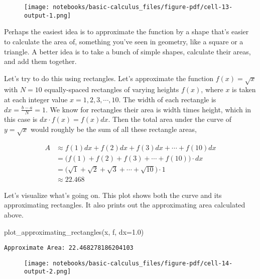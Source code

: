 \documentclass[
  letterpaper,
  DIV=11,
  numbers=noendperiod]{scrreprt}
\newenvironment{Shaded}{\begin{snugshade}}{\end{snugshade}}
\newcommand{\FloatTok}[1]{\textcolor[rgb]{0.68,0.00,0.00}{#1}}
\newcommand{\NormalTok}[1]{\textcolor[rgb]{0.00,0.23,0.31}{#1}}
\newcommand{\OperatorTok}[1]{\textcolor[rgb]{0.37,0.37,0.37}{#1}}
\begin{document}
\begin{figure}[H]

{\centering \texttt{[image: notebooks/basic-calculus\_files/figure-pdf/cell-13-output-1.png]}

}

\end{figure}

Perhaps the easiest idea is to approximate the function by a shape
that's easier to calculate the area of, something you've seen in
geometry, like a square or a triangle. A better idea is to take a bunch
of simple shapes, calculate their areas, and add them together.

Let's try to do this using rectangles. Let's approximate the function
\(f(x)=\sqrt{x}\) with \(N=10\) equally-spaced rectangles of varying
heights \(f(x)\), where \(x\) is taken at each integer value
\(x=1,2,3,\cdots,10\). The width of each rectangle is
\(dx=\frac{b-a}{N}=1\). We know for rectangles their area is width times
height, which in this case is \(dx \cdot f(x) = f(x)dx\). Then the total
area under the curve of \(y=\sqrt{x}\) would roughly be the sum of all
these rectangle areas,

\begin{align}
A &\approx f(1)dx + f(2)dx + f(3)dx + \cdots + f(10)dx \\
&= \big(f(1) + f(2) + f(3) + \cdots + f(10)\big)\cdot dx \\
&= \big(\sqrt{1} + \sqrt{2} + \sqrt{3} + \cdots + \sqrt{10}\big)\cdot 1 \\
&\approx 22.468
\end{align}

Let's visualize what's going on. This plot shows both the curve and its
approximating rectangles. It also prints out the approximating area
calculated above.

\begin{Shaded}
\begin{Highlighting}[]
\NormalTok{plot\_approximating\_rectangles(x, f, dx}\OperatorTok{=}\FloatTok{1.0}\NormalTok{)}
\end{Highlighting}
\end{Shaded}

\begin{verbatim}
Approximate Area: 22.468278186204103
\end{verbatim}

\begin{figure}[H]

{\centering \texttt{[image: notebooks/basic-calculus\_files/figure-pdf/cell-14-output-2.png]}

}

\end{figure}
\end{document}
